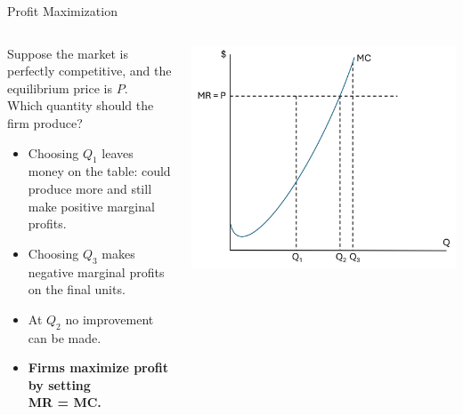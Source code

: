 \documentclass[9pt]{beamer}
\begin{document}
\begin{frame}{Profit Maximization}
    \begin{columns}[c]
    \begin{column}{0.5\textwidth}
    Suppose the market is perfectly competitive, and the equilibrium price is $P$.\\
    \vspace{5pt}
    Which quantity should the firm produce?
    \vspace{5pt}
        \begin{itemize}
            \item<2-> Choosing $Q_1$ leaves money on the table: could produce more and still make positive marginal profits.
            \vspace{5pt}
            \item<2-> Choosing $Q_3$ makes negative marginal profits on the final units.
            \vspace{5pt}
            \item<2-> At $Q_2$ no improvement can be made. 
            \vspace{10pt}
            \item<2-> \textbf{Firms maximize profit by setting\\
            MR = MC.}
        \end{itemize}
    \end{column}
    \begin{column}{0.5\textwidth}
        \includegraphics[width=\linewidth]{MC_again.png}
    \end{column}
\end{columns}
\end{frame}
\end{document}
